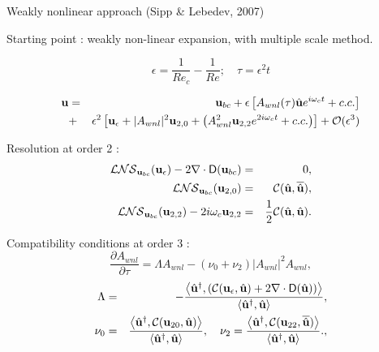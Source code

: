 \documentclass{beamer}
\newcommand{\be}[1]{ \begin{equation} \label{#1}}
\newcommand{\ee}{\end{equation}}
\begin{document}
\begin{frame}{Weakly nonlinear approach {\small (Sipp \& Lebedev, 2007)}}

\footnotesize

Starting point : weakly non-linear expansion, with multiple scale method.

$$
\epsilon = \frac{1}{Re_c} - \frac{1}{Re} ; \quad \tau = \epsilon^2 t
$$

\begin{eqnarray}
{\bf u} &=& {\bf u}_{bc} + \epsilon \left[ A_{wnl} (\tau) \hat{\bf u} e^{i \omega_c t} + c.c. \right] \label{WNL1}\\
&+& \epsilon^2 \left[ {\bf u}_\epsilon + |A_{wnl}|^2  {\bf u}_{2,0} + \left(  A_{wnl}^2 {\bf u}_{2,2} e^{2 i \omega_c t} + c.c. \right) \right] + {\cal O}( \epsilon ^3)
\nonumber
\end{eqnarray}

Resolution at order 2 :
\begin{eqnarray}
 {\cal LNS}_{{\bf u}_{bc}} ({\bf u}_\epsilon) - 2 \nabla \cdot {\mathsf D}({\bf u}_{bc}) &=&0,
\label{eq:LL1} \\
{\cal LNS}_{{\bf u}_{bc}} ({\bf u}_{2,0}) &=& {\cal C}(\hat{\bf u},\overline{\hat{\bf u}}), \label{eq:LL2} \\
{\cal LNS}_{{\bf u}_{bc}} ({\bf u}_{2,2}) - 2 i \omega_c {\bf u}_{2,2}  &=& \frac{1}{2} {\cal C}(\hat{\bf u},\hat{\bf u}). \label{eq:LL3}
 \end{eqnarray}

Compatibility conditions at order 3 :
\be{WNL3_2}
\frac{\partial A_{wnl}}{\partial \tau} = \Lambda A_{wnl} - (\nu_0+\nu_2)  |A_{wnl}|^2 A_{wnl},
\ee
\begin{eqnarray}
\Lambda &=& -\frac{ \left< {\hat{\bf u}}^\dag, 
\left( {\cal C}({\bf u}_\epsilon, \hat{\bf u}) + 2 \nabla \cdot  {\mathsf D}( \hat{\bf u}) \right) \right>}
{  \left<  \hat{\bf u}^\dag,\hat{\bf u} \right> },\label{LAMBDA}\\
\nu_0 &=& \frac{ \left< {\hat{\bf u}}^\dag,  {\cal C}({\bf u}_{20}, \hat{\bf u} ) \right>}
{  \left<  \hat{\bf u}^\dag,\hat{\bf u} \right> },\label{NU0}\quad
\nu_2 = \frac{ \left< {\hat{\bf u}}^\dag,  {\cal C}({\bf u}_{22}, \overline{\hat{\bf u}})  \right>}
{  \left<  \hat{\bf u}^\dag,\hat{\bf u} \right> }.,\label{NU2}
 \end{eqnarray}





\end{frame}
\end{document}
